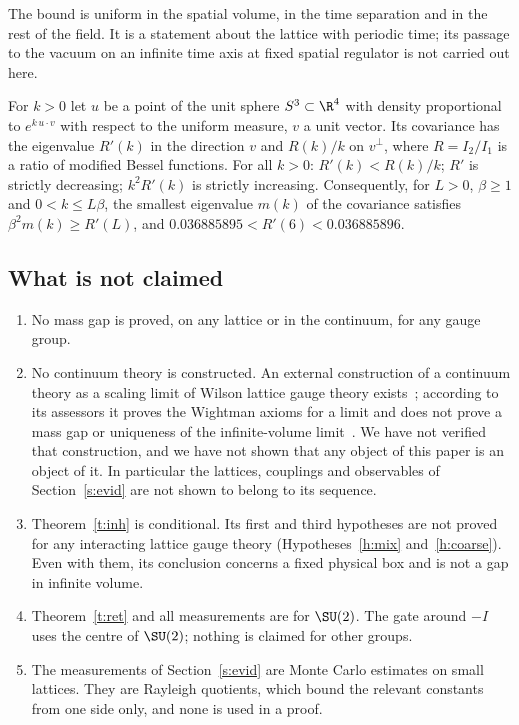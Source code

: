The bound is uniform in the spatial volume, in the time separation and in the rest of the field. It is a
statement about the lattice with periodic time; its passage to the vacuum on an infinite time axis at fixed
spatial regulator is not carried out here.

\begin{proposition}\label{p:haar}
For $k>0$ let $u$ be a point of the unit sphere $S^3\subset\R^4$ with density proportional to
$e^{k\,u\cdot v}$ with respect to the uniform measure, $v$ a unit vector. Its covariance has the eigenvalue
$R'(k)$ in the direction $v$ and $R(k)/k$ on $v^\perp$, where $R=I_2/I_1$ is a ratio of modified Bessel
functions. For all $k>0$: $R'(k)<R(k)/k$; $R'$ is strictly decreasing; $k^2R'(k)$ is strictly increasing.
Consequently, for $L>0$, $\beta\ge1$ and $0<k\le L\beta$, the smallest eigenvalue $m(k)$ of the covariance
satisfies $\beta^2m(k)\ge R'(L)$, and $0.036885895<R'(6)<0.036885896$.
\end{proposition}

\subsection{What is not claimed}\label{s:not}
\begin{enumerate}
\item No mass gap is proved, on any lattice or in the continuum, for any gauge group.
\item No continuum theory is constructed. An external construction of a continuum theory as a scaling limit of
Wilson lattice gauge theory exists~\cite{OAI,YMG}; according to its assessors it proves the Wightman axioms
for a limit and does not prove a mass gap or uniqueness of the infinite-volume limit~\cite[p.~1]{YMG}. We have
not verified that construction, and we have not shown that any object of this paper is an object of it. In
particular the lattices, couplings and observables of Section~\ref{s:evid} are not shown to belong to its
sequence.
\item Theorem~\ref{t:inh} is conditional. Its first and third hypotheses are not proved for any interacting
lattice gauge theory (Hypotheses~\ref{h:mix} and~\ref{h:coarse}). Even with them, its conclusion concerns a
fixed physical box and is not a gap in infinite volume.
\item Theorem~\ref{t:ret} and all measurements are for $\SU(2)$. The gate around $-I$ uses the centre of
$\SU(2)$; nothing is claimed for other groups.
\item The measurements of Section~\ref{s:evid} are Monte Carlo estimates on small lattices. They are Rayleigh
quotients, which bound the relevant constants from one side only, and none is used in a proof.
\end{enumerate}

